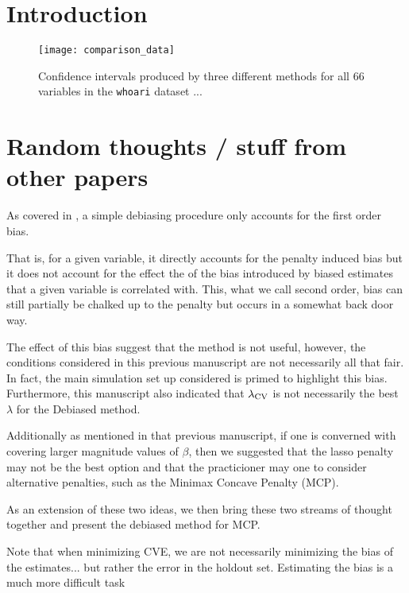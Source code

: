 \section{Introduction}

\begin{figure}[hbtp]
  \begin{center}
  \texttt{[image: comparison\_data]}
  \caption{\label{Fig:comparison_data_whoari} Confidence intervals produced by three different methods for all 66 variables in the \texttt{whoari} dataset ...}
  \end{center}
\end{figure}

\section{Random thoughts / stuff from other papers}

As covered in , a simple debiasing procedure only accounts for the first order bias.

That is, for a given variable, it directly accounts for the penalty induced bias but it does not account for the effect the of the bias introduced by biased estimates that a given variable is correlated with. This, what we call second order, bias can still partially be chalked up to the penalty but occurs in a somewhat back door way.

The effect of this bias suggest that the method is not useful, however, the conditions considered in this previous manuscript are not necessarily all that fair. In fact, the main simulation set up considered is primed to highlight this bias. Furthermore, this manuscript also indicated that $\lambda_{\textrm{CV}}$ is not necessarily the best $\lambda$ for the Debiased method.

Additionally as mentioned in that previous manuscript, if one is converned with covering larger magnitude values of $\beta$, then we suggested that the lasso penalty may not be the best option and that the practicioner may one to consider alternative penalties, such as the Minimax Concave Penalty (MCP).

As an extension of these two ideas, we then bring these two streams of thought together and present the debiased method for MCP.

Note that when minimizing CVE, we are not necessarily minimizing the bias of the estimates... but rather the error in the holdout set. Estimating the bias is a much more difficult task

